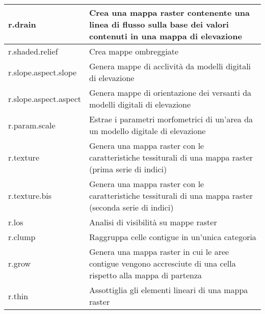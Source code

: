 \begin{table}[ht]
\begin{tabular}{|p{4cm}|p{12cm}|}
  \hline r.drain & Crea una mappa raster contenente una linea di flusso sulla base dei valori contenuti in una mappa di elevazione \\
  \hline r.shaded.relief & Crea mappe ombreggiate \\
  \hline r.slope.aspect.slope & Genera mappe di acclività da modelli digitali di elevazione \\
  \hline r.slope.aspect.aspect & Genera mappe di orientazione dei versanti da modelli digitali di elevazione \\
  \hline r.param.scale & Estrae i parametri morfometrici di un'area da un modello digitale di elevazione \\
  \hline r.texture & Genera una mappa raster con le caratteristiche tessiturali di una mappa raster (prima serie di indici) \\
  \hline r.texture.bis & Genera una mappa raster con le caratteristiche tessiturali di una mappa raster (seconda serie di indici) \\
  \hline r.los & Analisi di visibilità su mappe raster \\
  \hline r.clump & Raggruppa celle contigue in un'unica categoria \\
  \hline r.grow & Genera una mappa raster in cui le aree contigue vengono accresciute di una cella rispetto alla mappa di partenza \\
  \hline r.thin & Assottiglia gli elementi lineari di una mappa raster \\
\hline
\end{tabular}
\end{table}

